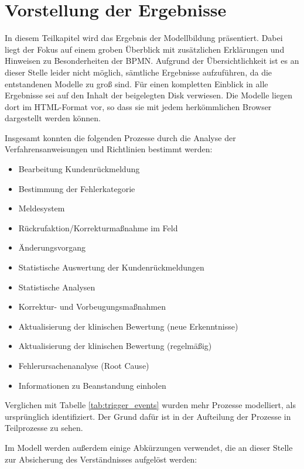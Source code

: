 \documentclass[a4paper,12pt]{report}
\begin{document}
\section{Vorstellung der Ergebnisse}\label{sec:ergebnisse_modellierung}
In diesem Teilkapitel wird das Ergebnis der Modellbildung präsentiert. Dabei liegt der Fokus auf einem groben Überblick mit zusätzlichen Erklärungen und Hinweisen zu Besonderheiten der BPMN. Aufgrund der Übersichtlichkeit ist es an dieser Stelle leider nicht möglich, sämtliche Ergebnisse aufzuführen, da die entstandenen Modelle zu groß sind. Für einen kompletten Einblick in alle Ergebnisse sei auf den Inhalt der beigelegten Disk verwiesen. Die Modelle liegen dort im HTML-Format vor, so dass sie mit jedem herkömmlichen Browser dargestellt werden können.

Insgesamt konnten die folgenden Prozesse durch die Analyse der Verfahrensanweisungen und Richtlinien bestimmt werden:

\begin{itemize}
\item Bearbeitung Kundenrückmeldung
\item Bestimmung der Fehlerkategorie
\item Meldesystem
\item Rückrufaktion/Korrekturmaßnahme im Feld
\item Änderungsvorgang
\item Statistische Auswertung der Kundenrückmeldungen
\item Statistische Analysen
\item Korrektur- und Vorbeugungsmaßnahmen
\item Aktualisierung der klinischen Bewertung (neue Erkenntnisse)
\item Aktualisierung der klinischen Bewertung (regelmäßig)
\item Fehlerursachenanalyse (Root Cause)
\item Informationen zu Beanstandung einholen
\end{itemize}

Verglichen mit Tabelle \ref{tab:trigger_events} wurden mehr Prozesse modelliert, als ursprünglich identifiziert. Der Grund dafür ist in der Aufteilung der Prozesse in Teilprozesse zu sehen. 

Im Modell werden außerdem einige Abkürzungen verwendet, die an dieser Stelle zur Absicherung des Verständnisses aufgelöst werden:
\end{document}
